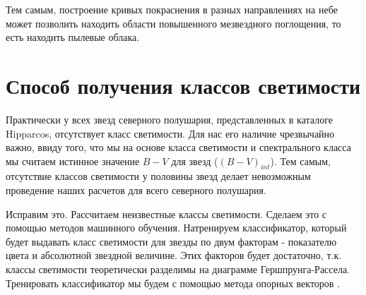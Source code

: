 \documentclass[14pt]{article}
\begin{document}
                Тем самым, построение кривых покраснения в разных направлениях на небе может позволить находить области повышенного мезвездного поглощения, то есть находить пылевые облака.
        
        
        
        
        
    \section{Способ получения классов светимости}

        Практически у всех звезд северного полушария, представленных в каталоге Hipparcos, отсутствует класс светимости. Для нас его наличие чрезвычайно важно, ввиду того, что мы на основе класса светимости и спектрального класса мы считаем истинное значение $B - V$ для звезд ($(B - V)_{int}$). Тем самым, отсутствие классов светимости у половины звезд делает невозможным проведение наших расчетов для всего северного полушария.

        Исправим это. Рассчитаем неизвестные классы светимости. Сделаем это с помощью методов машинного обучения. Натренируем классификатор, который будет выдавать класс светимости для звезды по двум факторам - показателю цвета и абсолютной звездной величине. Этих факторов будет достаточно, т.к. классы светимости теоретически разделимы на диаграмме Гершпрунга-Рассела. Тренировать классификатор мы будем с помощью метода опорных векторов \cite{svm}.
        
\end{document}
